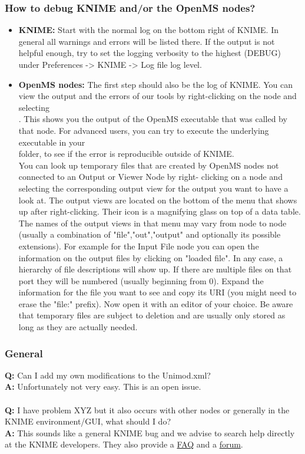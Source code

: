 \subsubsection{How to debug KNIME and/or the OpenMS nodes?}
\begin{itemize}
\item \textbf{KNIME:} Start with the normal log on the bottom right of KNIME. In general all warnings and errors will be
listed there. If the output is not helpful enough, try to set the logging verbosity to the highest (DEBUG) under
Preferences -> KNIME -> Log file log level.
\item \textbf{OpenMS nodes:} The first step should also be the log of KNIME. You can view the output and the errors of our
tools by right-clicking on the node and selecting\\
. This shows you the output of the OpenMS executable that was called by that 
node. For advanced users, you can try 
to execute the underlying executable in your\\
 folder, 
to see if the error is reproducible outside of KNIME.\\
You can look up temporary files that are created by OpenMS nodes not connected to an Output or Viewer Node by right-
clicking on a node and selecting the corresponding output view for the output you want to have a look at. The output 
views are located on the bottom of the menu that shows up after right-clicking. Their icon is a magnifying glass on 
top of a data table. The names of the output views in that menu may vary from node to node (usually a combination of 
"file","out","output" and optionally its possible extensions). For example for the Input File node you can open the 
information on the output files by clicking on "loaded file". In any case, a hierarchy of file descriptions will show 
up. If there are multiple files on that port they will be numbered (usually beginning from 0). Expand the information 
for the file you want to see and copy its URI (you might need to erase the "file:" prefix). Now open it with an 
editor of your choice. Be aware that temporary files are subject to deletion and are usually only stored as long as 
they are actually needed.
\end{itemize}

\subsubsection{General}
\textbf{Q:} Can I add my own modifications to the Unimod.xml?\\
\textbf{A:} Unfortunately not very easy. This is an open issue.
\\\\
\textbf{Q:} I have problem XYZ but it also occurs with other nodes or generally in the KNIME environment/GUI, what should I do?\\
\textbf{A:} This sounds like a general KNIME bug and we advise to search help directly at the KNIME developers. They also provide a \href{https://tech.knime.org/
faq}{FAQ} and a \href{https://tech.knime.org/forum}{forum}.

